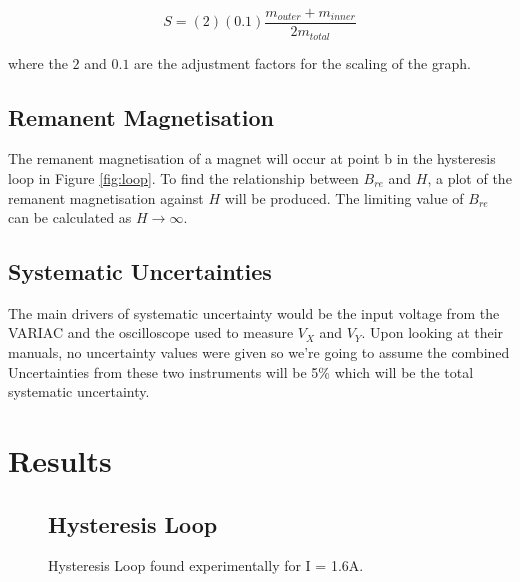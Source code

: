 \documentclass{article}
\begin{document}
\begin{equation}
    S = (2)(0.1)\frac{m_{outer}+m_{inner}}{2m_{total}}
\end{equation}

where the $2$ and $0.1$ are the adjustment factors for the scaling of the graph.

\subsection{Remanent Magnetisation}
The remanent magnetisation of a magnet will occur at point b in the hysteresis loop in Figure \ref{fig:loop}.
To find the relationship between $B_{re}$ and $H$, a plot of the remanent magnetisation against $H$ will
be produced. The limiting value of $B_{re}$ can be calculated as $H\rightarrow \infty$.

\subsection{Systematic Uncertainties} \label{sec:sigma}
The main drivers of systematic uncertainty would be the input voltage from the VARIAC and the oscilloscope used
to measure $V_X$ and $V_Y$. Upon looking at their manuals, no uncertainty values were given so we're going to 
assume the combined Uncertainties from these two instruments will be 5\% which will be the total systematic uncertainty.

\section{Results}

\begin{figure} [H]
    \subsection{Hysteresis Loop}
    \centering
    \scalebox{0.75}{}
    \label{fig:loopexp}
    \caption{Hysteresis Loop found experimentally for I = 1.6A.}
\end{figure}

\FloatBarrier
\end{document}
